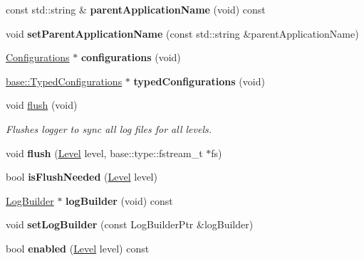 \begin{DoxyCompactItemize}
\item 
\hypertarget{a00048_a9e56e468bccd7b52281e7bbc75892431}{}const std\+::string \& {\bfseries parent\+Application\+Name} (void) const \label{a00048_a9e56e468bccd7b52281e7bbc75892431}

\item 
\hypertarget{a00048_a6890af8910adba26b01ef029429c4f15}{}void {\bfseries set\+Parent\+Application\+Name} (const std\+::string \&parent\+Application\+Name)\label{a00048_a6890af8910adba26b01ef029429c4f15}

\item 
\hypertarget{a00048_aeb57aeaddbb3dcd0cb96114019817142}{}\hyperlink{a00014}{Configurations} $\ast$ {\bfseries configurations} (void)\label{a00048_aeb57aeaddbb3dcd0cb96114019817142}

\item 
\hypertarget{a00048_ac1d34e77892ea506b011d5279b6b139d}{}\hyperlink{a00092}{base\+::\+Typed\+Configurations} $\ast$ {\bfseries typed\+Configurations} (void)\label{a00048_ac1d34e77892ea506b011d5279b6b139d}

\item 
\hypertarget{a00048_a9a89d454008b1ee1a197eec4b92ce22a}{}void \hyperlink{a00048_a9a89d454008b1ee1a197eec4b92ce22a}{flush} (void)\label{a00048_a9a89d454008b1ee1a197eec4b92ce22a}

\begin{DoxyCompactList}\small\item\em Flushes logger to sync all log files for all levels. \end{DoxyCompactList}\item 
\hypertarget{a00048_a83c85278ebeeef6a24cc112e56c344dd}{}void {\bfseries flush} (\hyperlink{a00183_ab0ac6091262344c52dd2d3ad099e8e36}{Level} level, base\+::type\+::fstream\+\_\+t $\ast$fs)\label{a00048_a83c85278ebeeef6a24cc112e56c344dd}

\item 
\hypertarget{a00048_abdf56c00388c71d1cbaa7e2df4449202}{}bool {\bfseries is\+Flush\+Needed} (\hyperlink{a00183_ab0ac6091262344c52dd2d3ad099e8e36}{Level} level)\label{a00048_abdf56c00388c71d1cbaa7e2df4449202}

\item 
\hypertarget{a00048_aead5b130c5141d2024740b03ab4b45d7}{}\hyperlink{a00042}{Log\+Builder} $\ast$ {\bfseries log\+Builder} (void) const \label{a00048_aead5b130c5141d2024740b03ab4b45d7}

\item 
\hypertarget{a00048_a737340322cc9d9d20febd7131c1e262f}{}void {\bfseries set\+Log\+Builder} (const Log\+Builder\+Ptr \&log\+Builder)\label{a00048_a737340322cc9d9d20febd7131c1e262f}

\item 
\hypertarget{a00048_a5abaca24ac28bfd4806bea32be193435}{}bool {\bfseries enabled} (\hyperlink{a00183_ab0ac6091262344c52dd2d3ad099e8e36}{Level} level) const \label{a00048_a5abaca24ac28bfd4806bea32be193435}

\end{DoxyCompactItemize}
